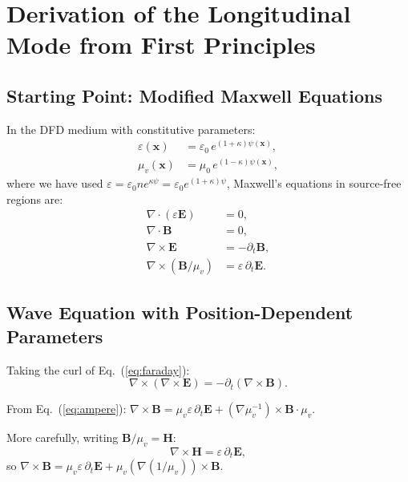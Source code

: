 \documentclass[aps,prd,twocolumn,superscriptaddress,nofootinbib,floatfix]{revtex4-2}
\newcommand{\xvec}{\mathbf{x}}
\newcommand{\Evec}{\mathbf{E}}
\newcommand{\Bvec}{\mathbf{B}}
\begin{document}
\section{Derivation of the Longitudinal Mode from First Principles}
\label{sec:derivation}

\subsection{Starting Point: Modified Maxwell Equations}

In the DFD medium with constitutive parameters:
\begin{align}
\varepsilon(\xvec) &= \varepsilon_0\,e^{(1+\kappa)\psi(\xvec)}, \label{eq:eps}\\
\mu_v(\xvec) &= \mu_0\,e^{(1-\kappa)\psi(\xvec)}, \label{eq:mu}
\end{align}
where we have used
$\varepsilon = \varepsilon_0 n e^{\kappa\psi} = \varepsilon_0 e^{(1+\kappa)\psi}$,
Maxwell's equations in source-free regions are:
\begin{align}
\nabla\cdot(\varepsilon\Evec) &= 0, \label{eq:divDE}\\
\nabla\cdot\Bvec &= 0, \label{eq:divB}\\
\nabla\times\Evec &= -\partial_t\Bvec, \label{eq:faraday}\\
\nabla\times(\Bvec/\mu_v) &= \varepsilon\,\partial_t\Evec. \label{eq:ampere}
\end{align}

\subsection{Wave Equation with Position-Dependent Parameters}

Taking the curl of Eq.~(\ref{eq:faraday}):
\begin{equation}
\nabla\times(\nabla\times\Evec) = -\partial_t(\nabla\times\Bvec).
\label{eq:curl-faraday}
\end{equation}

From Eq.~(\ref{eq:ampere}):
$\nabla\times\Bvec = \mu_v\varepsilon\,\partial_t\Evec + (\nabla\mu_v^{-1})\times\Bvec \cdot \mu_v$.

More carefully, writing $\Bvec/\mu_v = \mathbf{H}$:
\begin{equation}
\nabla\times\mathbf{H} = \varepsilon\,\partial_t\Evec,
\end{equation}
so $\nabla\times\Bvec = \mu_v\varepsilon\,\partial_t\Evec + \mu_v(\nabla(1/\mu_v))\times\Bvec$.
\end{document}
